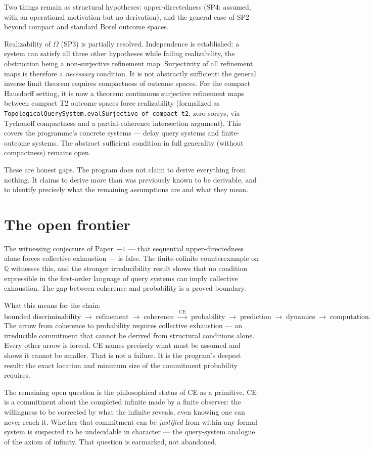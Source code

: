 Two things remain as structural hypotheses: upper-directedness
(SP4: assumed, with an operational motivation but no derivation),
and the general case of SP2 beyond compact and standard Borel
outcome spaces.

Realizability of $\Omega$ (SP3) is partially resolved.
Independence is established: a system can satisfy all three other
hypotheses while failing realizability, the obstruction being
a non-surjective refinement map.
Surjectivity of all refinement maps is therefore a \emph{necessary}
condition.  It is not abstractly sufficient: the general inverse
limit theorem requires compactness of outcome spaces.
For the compact Hausdorff setting, it is now a theorem: continuous
surjective refinement maps between compact T2 outcome spaces force
realizability (formalized as
\texttt{TopologicalQuerySystem.evalSurjective\_of\_compact\_t2},
zero sorrys, via Tychonoff compactness and a partial-coherence
intersection argument).  This covers the programme's concrete
systems --- delay query systems and finite-outcome systems.
The abstract sufficient condition in full generality (without
compactness) remains open.

These are honest gaps.  The program does not claim to derive
everything from nothing.  It claims to derive more than was
previously known to be derivable, and to identify precisely what
the remaining assumptions are and what they mean.

\section*{The open frontier}

The witnessing conjecture of Paper~$-1$ --- that sequential
upper-directedness alone forces collective exhaustion --- is false.
The finite-cofinite counterexample on $\mathbb{Q}$ witnesses this,
and the stronger irreducibility result shows that no condition
expressible in the first-order language of query systems can imply
collective exhaustion.  The gap between coherence and probability
is a proved boundary.

What this means for the chain:
\[
\text{bounded discriminability}
\;\to\;
\text{refinement}
\;\to\;
\text{coherence}
\;\xrightarrow{\;\text{CE}\;}\;
\text{probability}
\;\to\;
\text{prediction}
\;\to\;
\text{dynamics}
\;\to\;
\text{computation.}
\]
The arrow from coherence to probability requires collective
exhaustion --- an irreducible commitment that cannot be derived
from structural conditions alone.  Every other arrow is forced.
CE names precisely what must be assumed and shows it cannot be
smaller.  That is not a failure.  It is the program's deepest
result: the exact location and minimum size of the commitment
probability requires.

The remaining open question is the philosophical status of CE
as a primitive.  CE is a commitment about the completed infinite
made by a finite observer: the willingness to be corrected by
what the infinite reveals, even knowing one can never reach it.
Whether that commitment can be \emph{justified} from within any
formal system is suspected to be undecidable in character ---
the query-system analogue of the axiom of infinity.  That
question is earmarked, not abandoned.
